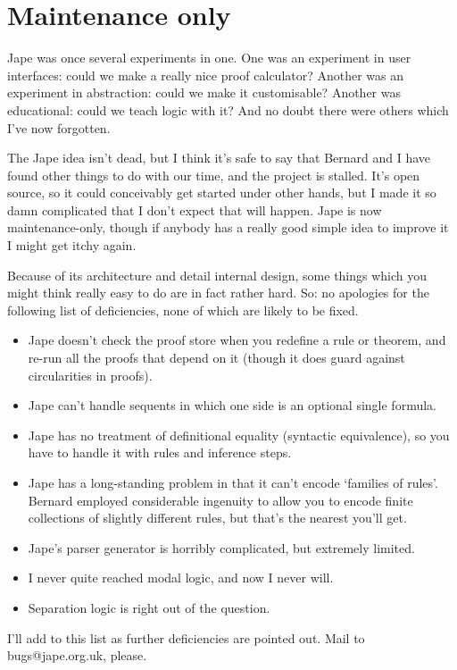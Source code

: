 \section*{Maintenance only}

Jape was once several experiments in one. One was an experiment in user interfaces: could we make a really nice proof calculator? Another was an experiment in abstraction: could we make it customisable? Another was educational: could we teach logic with it? And no doubt there were others which I've now forgotten.

The Jape idea isn't dead, but I think it's safe to say that Bernard and I have found other things to do with our time, and the project is stalled. It's open source, so it could conceivably get started under other hands, but I made it so damn complicated that I don't expect that will happen. Jape is now maintenance-only, though if anybody has a really good simple idea to improve it I might get itchy again.

Because of its architecture and detail internal design, some things which you might think really easy to do are in fact rather hard. So: no apologies for the following list of deficiencies, none of which are likely to be fixed.

\begin{itemize}
\item Jape doesn't check the proof store when you redefine a rule or theorem, and re-run all the proofs that depend on it (though it does guard against circularities in proofs).
\item Jape can't handle sequents in which one side is an optional single formula.
\item Jape has no treatment of definitional equality (syntactic equivalence), so you have to handle it with rules and inference steps.
\item Jape has a long-standing problem in that it can't encode `families of rules'. Bernard employed considerable ingenuity to allow you to encode finite collections of slightly different rules, but that's the nearest you'll get.
\item Jape's parser generator is horribly complicated, but extremely limited.
\item I never quite reached modal logic, and now I never will.
\item Separation logic is right out of the question.
\end{itemize}

I'll add to this list as further deficiencies are pointed out. Mail to bugs@jape.org.uk, please.